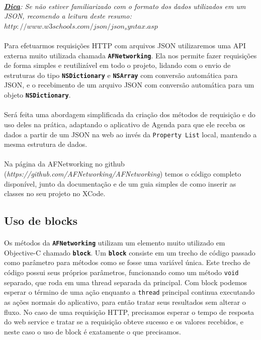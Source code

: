 \documentclass[a4paper,12pt,brazil,doubleside]{book}
\begin{document}
\bigskip

\paragraph{}\textit{\textbf{\underline{Dica}}: Se não estiver familiarizado com o formato dos dados utilizados em um JSON, recomendo a leitura deste resumo:\\
\(http://www.w3schools.com/json/json_syntax.asp\)}

\bigskip

\paragraph{}Para efetuarmos requisições HTTP com arquivos JSON utilizaremos uma API externa muito utilizada chamada \texttt{\textbf{AFNetworking}}. Ela nos permite fazer requisições de forma simples e reutilizável em todo o projeto, lidando com o envio de estruturas do tipo \texttt{\textbf{NSDictionary}} e \texttt{\textbf{NSArray}} com conversão automática para JSON, e o recebimento de um arquivo JSON com conversão automática para um objeto \texttt{\textbf{NSDictionary}}.
\paragraph{}Será feita uma abordagem simplificada da criação dos métodos de requisição e do uso deles na prática, adaptando o aplicativo de Agenda para que ele receba os dados a partir de um JSON na web ao invés da \texttt{Property List} local, mantendo a mesma estrutura de dados.
\paragraph{}Na página da AFNetworking no github (\textit{https://github.com/AFNetworking/AFNetworking}) temos o código completo disponível, junto da documentação e de um guia simples de como inserir as classes no seu projeto no XCode.

\bigskip

\subsection{Uso de blocks}

\paragraph{}Os métodos da \texttt{\textbf{AFNetworking}} utilizam um elemento muito utilizado em Objective-C chamado \texttt{\textbf{block}}. Um \texttt{\textbf{block}} consiste em um trecho de código passado como parâmetro para métodos como se fosse uma variável única. Este trecho de código possui seus próprios parâmetros, funcionando como um método \texttt{void} separado, que roda em uma thread separada da principal. Com block podemos esperar o término de uma ação enquanto a \texttt{thread} principal continua executando as ações normais do aplicativo, para então tratar seus resultados sem alterar o fluxo. No caso de uma requisição HTTP, precisamos esperar o tempo de resposta do web service e tratar se a requisição obteve sucesso e os valores recebidos, e neste caso o uso de block é exatamente o que precisamos.
\end{document}
